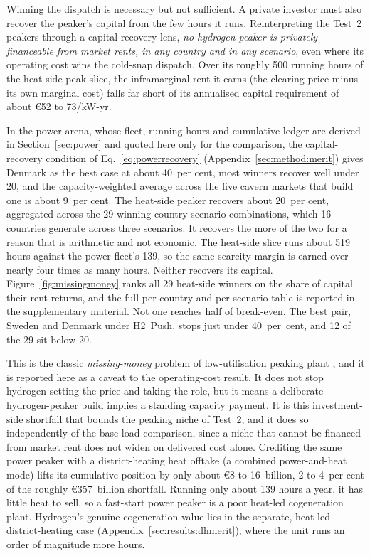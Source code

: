 Winning the dispatch is necessary but not sufficient. A private investor must also recover the
peaker's capital from the few hours it runs. Reinterpreting the Test~2 peakers through a
capital-recovery lens, \emph{no hydrogen peaker is privately financeable from market rents, in any
country and in any scenario}, even where its operating cost wins the cold-snap dispatch. Over its
roughly 500 running hours of the heat-side peak slice, the inframarginal rent it earns (the clearing
price minus its own marginal cost) falls far short of its annualised capital requirement of about
\euro{}52 to 73/kW-yr.

In the power arena, whose fleet, running hours and cumulative ledger are derived in
Section~\ref{sec:power} and quoted here only for the comparison, the capital-recovery
condition of Eq.~\eqref{eq:powerrecovery} (Appendix~\ref{sec:method:merit}) gives
Denmark as
the best case at about 40~per cent, most
winners recover well under 20, and the capacity-weighted average across the five cavern markets that build one is about 9~per cent. The heat-side peaker recovers about 20~per cent, aggregated across the 29
winning country-scenario combinations, which 16 countries generate across three scenarios. It
recovers the more of the two for a reason that is arithmetic and not economic. The
heat-side slice runs about 519 hours against the power fleet's 139, so the same scarcity
margin is earned over nearly four times as many hours. Neither recovers its capital.
Figure~\ref{fig:missingmoney} ranks all 29 heat-side winners on the share of capital their rent returns, and the full per-country and per-scenario table is reported in the supplementary material. Not one reaches half of break-even. The best pair, Sweden and Denmark under H2~Push,
stops just under 40~per~cent, and 12 of the 29 sit below 20.

This is the classic
\emph{missing-money} problem of low-utilisation peaking plant \citep{Joskow2008capacity}, and it is
reported here as a caveat to the operating-cost result. It does
not stop hydrogen setting the price and taking the role, but it means a deliberate hydrogen-peaker
build implies a standing capacity payment. It is this investment-side shortfall that bounds the
peaking niche of Test~2, and it does so independently of the base-load comparison, since a niche
that cannot be financed from market rent does not widen on delivered cost alone. Crediting the same power peaker with
a district-heating heat offtake (a combined power-and-heat mode) lifts its cumulative position by
only about \euro{}8 to 16~billion, 2 to 4~per cent of the roughly \euro{}357~billion
shortfall.
Running only about 139 hours a year, it has little heat to sell, so a
fast-start power peaker is a poor heat-led cogeneration plant. Hydrogen's genuine cogeneration value lies in the separate, heat-led
district-heating case (Appendix~\ref{sec:results:dhmerit}), where the unit runs an order of magnitude more hours.


